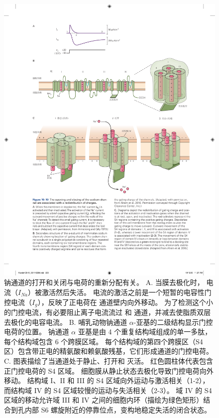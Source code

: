 \begin{figure}[htbp]
	\centering
	\includegraphics[width=1.0\linewidth]{chap10/fig_10_10}
	\caption{钠通道的打开和关闭与电荷的重新分配有关。
		A. 当膜去极化时， 电流（$I_{Na}$）被激活然后失活。
		 电流的激活之前是一个短暂的电容性门控电流（$I_g$），反映了正电荷在  通道壁内向外移动。
		为了检测这个小的门控电流，有必要阻止离子电流流过  和  通道，并减去使脂质双层去极化的电容电流\cite{armstrong1979fast}。
		B. 哺乳动物钠通道 $\alpha$-亚基的二级结构显示门控电荷的位置。
		钠通道 $\alpha$ 亚基是由 4 个重复结构域组成的单一多肽，每个结构域包含 6 个跨膜区域。
		每个结构域的第四个跨膜区（S4 区）包含带正电的精氨酸和赖氨酸残基，它们形成通道的门控电荷\cite{ahern2016hitchhiker}。
		C. 图表描绘了当通道处于静止、打开和 灭活。
		红色圆柱体代表包含正门控电荷的 S4 区域。
		细胞膜从静止状态去极化导致门控电荷向外移动。
		结构域 I、II 和 III 的 S4 区域向外运动与激活相关（1-2），而结构域 IV 的 S4 区域较慢的运动与失活相关（2-3）。
		域 IV 的 S4 区域的移动允许域 III 和 IV 之间的细胞内环（描绘为绿色矩形）结合到孔内部 S6 螺旋附近的停靠位点，变构地稳定失活的闭合状态\cite{ahern2016hitchhiker}。}
	\label{fig:10_10}
\end{figure}



